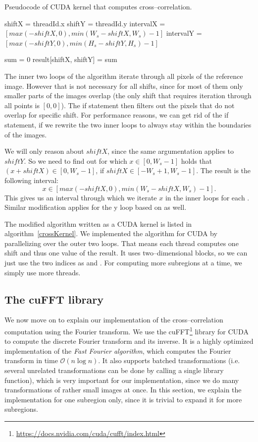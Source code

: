 \begin{algorithm}
	\caption{Pseudocode of CUDA kernel that computes cross--correlation.}
	\label{crossKernel}
	
	shiftX = threadId.x\;
	shiftY = threadId.y\;
	intervalX = $[max(-shiftX, 0), min(W_s - shiftX, W_s) - 1]$\;
	intervalY = $[max(-shiftY, 0), min(H_s - shiftY, H_s) - 1]$\;
	
	sum = 0\;
	result[shiftX, shiftY] = sum\;
	
\end{algorithm}

The inner two loops of the algorithm iterate through all pixels of the reference image. However that is not necessary for all shifts, since for most of them only smaller parts of the images overlap (the only shift that requires iteration through all points is $[0,0]$). The if statement then filters out the pixels that do not overlap for specific shift. For performance reasons, we can get rid of the if statement, if we rewrite the two inner loops to always stay within the boundaries of the images.

We will only reason about $shiftX$, since the same argumentation applies to $shiftY$. So we need to find out for which $x \in [0, W_s - 1]$ holds that $(x + shiftX) \in [0, W_s-1]$, if $shiftX \in [-W_s+1, W_s-1]$. The result is the following interval:
\[
x \in [max(-shiftX, 0), min(W_s - shiftX, W_s) - 1].
\]
This gives us an interval through which we iterate $x$ in the inner loops for each . Similar modification applies for the y loop based on  as well.

The modified algorithm written as a CUDA kernel is listed in algorithm~\ref{crossKernel}. We implemented the algorithm for CUDA by parallelizing over the outer two loops. That means each thread computes one shift and thus one value of the result. It uses two--dimensional blocks, so we can just use the two indices as  and . For computing more subregions at a time, we simply use more threads.

\subsection{The cuFFT library}
We now move on to explain our implementation of the cross--correlation computation using the Fourier transform. We use the cuFFT\footnote{\url{https://docs.nvidia.com/cuda/cufft/index.html}} library for CUDA to compute the discrete Fourier transform and its inverse. It is a highly optimized implementation of the \emph{Fast Fourier algorithm}, which computes the Fourier transform in time $\mathcal{O}(n \log n)$. It also supports batched transformations (i.e. several unrelated transformations can be done by calling a single library function), which is very important for our implementation, since we do many transformations of rather small images at once. In this section, we explain the implementation for one subregion only, since it is trivial to expand it for more subregions.

